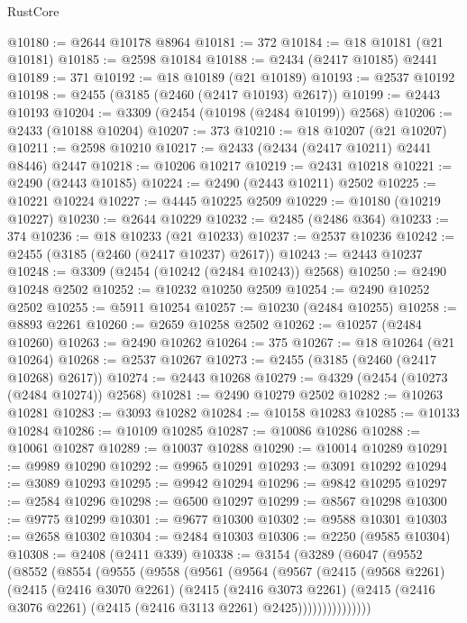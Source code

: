 \begin{lexlean}{RustCore}
\begin{coremodule}
@10180 := @2644 @10178 @8964
@10181 := 372
@10184 := @18 @10181 (@21 @10181)
@10185 := @2598 @10184
@10188 := @2434 (@2417 @10185) @2441
@10189 := 371
@10192 := @18 @10189 (@21 @10189)
@10193 := @2537 @10192
@10198 := @2455 (@3185 (@2460 (@2417 @10193) @2617))
@10199 := @2443 @10193
@10204 := @3309 (@2454 (@10198 (@2484 @10199)) @2568)
@10206 := @2433 (@10188 @10204)
@10207 := 373
@10210 := @18 @10207 (@21 @10207)
@10211 := @2598 @10210
@10217 := @2433 (@2434 (@2417 @10211) @2441 @8446) @2447
@10218 := @10206 @10217
@10219 := @2431 @10218
@10221 := @2490 (@2443 @10185)
@10224 := @2490 (@2443 @10211) @2502
@10225 := @10221 @10224
@10227 := @4445 @10225 @2509
@10229 := @10180 (@10219 @10227)
@10230 := @2644 @10229
@10232 := @2485 (@2486 @364)
@10233 := 374
@10236 := @18 @10233 (@21 @10233)
@10237 := @2537 @10236
@10242 := @2455 (@3185 (@2460 (@2417 @10237) @2617))
@10243 := @2443 @10237
@10248 := @3309 (@2454 (@10242 (@2484 @10243)) @2568)
@10250 := @2490 @10248 @2502
@10252 := @10232 @10250 @2509
@10254 := @2490 @10252 @2502
@10255 := @5911 @10254
@10257 := @10230 (@2484 @10255)
@10258 := @8893 @2261
@10260 := @2659 @10258 @2502
@10262 := @10257 (@2484 @10260)
@10263 := @2490 @10262
@10264 := 375
@10267 := @18 @10264 (@21 @10264)
@10268 := @2537 @10267
@10273 := @2455 (@3185 (@2460 (@2417 @10268) @2617))
@10274 := @2443 @10268
@10279 := @4329 (@2454 (@10273 (@2484 @10274)) @2568)
@10281 := @2490 @10279 @2502
@10282 := @10263 @10281
@10283 := @3093 @10282
@10284 := @10158 @10283
@10285 := @10133 @10284
@10286 := @10109 @10285
@10287 := @10086 @10286
@10288 := @10061 @10287
@10289 := @10037 @10288
@10290 := @10014 @10289
@10291 := @9989 @10290
@10292 := @9965 @10291
@10293 := @3091 @10292
@10294 := @3089 @10293
@10295 := @9942 @10294
@10296 := @9842 @10295
@10297 := @2584 @10296
@10298 := @6500 @10297
@10299 := @8567 @10298
@10300 := @9775 @10299
@10301 := @9677 @10300
@10302 := @9588 @10301
@10303 := @2658 @10302
@10304 := @2484 @10303
@10306 := @2250 (@9585 @10304)
@10308 := @2408 (@2411 @339)
@10338 := @3154
    (@3289
      (@6047
        (@9552
          (@8552
            (@8554
              (@9555
                (@9558
                  (@9561
                    (@9564
                      (@9567
                        (@2415
                          (@9568 @2261)
                          (@2415
                            (@2416 @3070 @2261)
                            (@2415
                              (@2416 @3073 @2261)
                              (@2415
                                (@2416 @3076 @2261)
                                (@2415 (@2416 @3113 @2261) @2425)))))))))))))))

\end{coremodule}
\end{lexlean}
